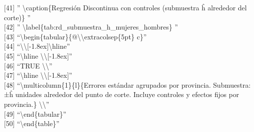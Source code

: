 \documentclass[
]{article}
\begin{document}
{[}41{]} '' \textbackslash caption\{Regresión Discontinua con controles
(submuestra ĥ alrededor del corte)\} ''\\
{[}42{]} ''
\textbackslash label\{tab:rd\_submuestra\_h\_mujeres\_hombres\} ''\\
{[}43{]}
``\textbackslash begin\{tabular\}\{@\textbackslash\textbackslash extracolsep\{5pt\}
c\}''\\
{[}44{]}
``\textbackslash\textbackslash{[}-1.8ex{]}\textbackslash hline''\\
{[}45{]} ``\textbackslash hline
\textbackslash\textbackslash{[}-1.8ex{]}''\\
{[}46{]} ``TRUE \textbackslash\textbackslash{}''\\
{[}47{]} ``\textbackslash hline
\textbackslash\textbackslash{[}-1.8ex{]}''\\
{[}48{]} ``\textbackslash multicolumn\{1\}\{l\}\{Errores estándar
agrupados por provincia. Submuestra: ±ĥ unidades alrededor del punto de
corte. Incluye controles y efectos fijos por provincia.\}
\textbackslash\textbackslash{}''\\
{[}49{]} ``\textbackslash end\{tabular\}''\\
{[}50{]} ``\textbackslash end\{table\}''
\end{document}
